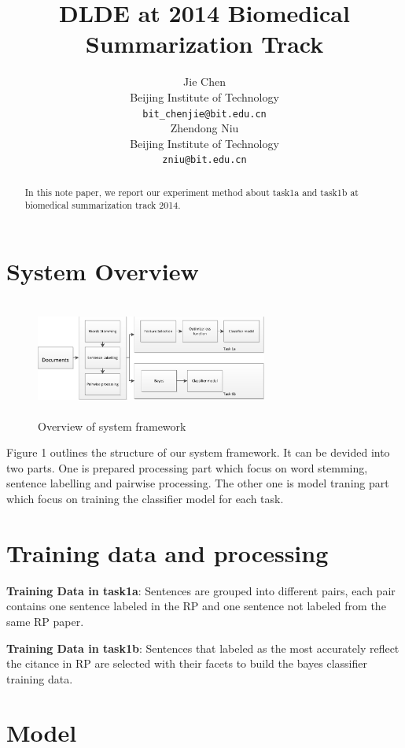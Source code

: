 \documentclass[11pt]{article}
\title{DLDE at 2014 Biomedical Summarization Track}
\author{Jie Chen \\
  Beijing Institute of Technology \\
  {\tt bit\_chenjie@bit.edu.cn} \\\And
  Zhendong Niu \\
  Beijing Institute of Technology \\
  {\tt zniu@bit.edu.cn} \\}
\date{}
\begin{document}
\maketitle
\begin{abstract}
In this note paper, we report our experiment method about task1a and task1b at biomedical summarization track 2014.

\end{abstract}



\section{System Overview}


\begin{figure}[H]
    \centering
    \includegraphics[height = 1.5in, width = 3.0in]{bio-frame2.eps}
    \caption{Overview of system framework}
    \label{fig:system-framework}
\end{figure}

Figure 1 outlines the structure of our system framework.
It can be devided into two parts.
One is prepared processing part which focus on word stemming, sentence labelling and pairwise processing.
The other one is model traning part which focus on training the classifier model for each task.



\section{Training data and processing}

{\bf Training Data in task1a}: Sentences are grouped into different pairs, each pair contains one sentence labeled in the RP and one sentence not labeled from the same RP paper.

{\bf Training Data in task1b}: Sentences that labeled as the most accurately reflect the citance in RP are selected with their facets to build the bayes classifier training data.


\section{Model}
\end{document}
